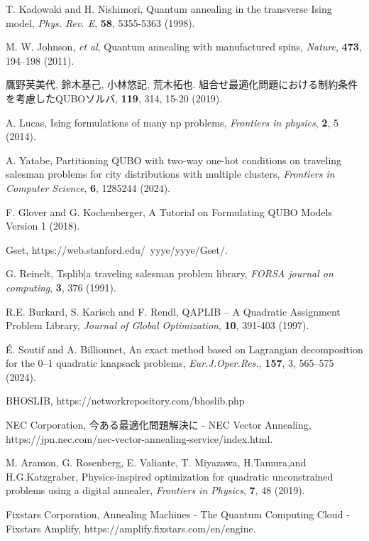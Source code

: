 \documentclass[submit,techrep,noauthor]{ipsj}
\begin{document}
\begin{thebibliography}{10}

T. Kadowaki and H. Nishimori, Quantum annealing in the transverse Ising model, {\it Phys. Rev. E}, {\bf 58}, 5355-5363 (1998).

M. W. Johnson, {\it et al}, Quantum annealing with manufactured spins, {\it Nature}, {\bf 473}, 194–198 (2011).

鷹野芙美代, 鈴木基己, 小林悠記, 荒木拓也. 組合せ最適化問題における制約条件を考慮したQUBOソルバ, {\bf 119}, 314, 15-20 (2019).

A. Lucas, Ising formulations of many np problems, {\it Frontiers in physics}, {\bf 2}, 5 (2014).

A. Yatabe, Partitioning QUBO with two-way one-hot conditions on traveling salesman problems for city distributions with multiple clusters, {\it Frontiers in Computer Science}, {\bf 6}, 1285244 (2024).

F. Glover and G. Kochenberger, A Tutorial on Formulating QUBO Models Version 1 (2018).

Gset, https://web.stanford.edu/~yyye/yyye/Gset/.

G. Reinelt, Tsplib|a traveling salesman problem library, {\it FORSA journal on computing}, {\bf 3}, 376 (1991).

R.E. Burkard, S. Karisch and F. Rendl, QAPLIB – A Quadratic Assignment Problem Library, {\it Journal of Global Optimization}, {\bf 10}, 391-403 (1997).

É. Soutif and A. Billionnet, An exact method based on Lagrangian decomposition for the 0–1 quadratic knapsack problems, {\it Eur.J.Oper.Res.}, {\bf 157}, 3, 565–575 (2024).

BHOSLIB, https://networkrepository.com/bhoslib.php

NEC Corporation, 今ある最適化問題解決に - NEC Vector Annealing, https://jpn.nec.com/nec-vector-annealing-service/index.html.

M. Aramon, G. Rosenberg, E. Valiante, T. Miyazawa, H.Tamura,and H.G.Katzgraber, Physics-inspired optimization for quadratic unconstrained problems using a digital annealer, {\it Frontiers in Physics}, {\bf 7}, 48 (2019).

Fixstars Corporation, Annealing Machines - The Quantum Computing Cloud - Fixstars Amplify, https://amplify.fixstars.com/en/engine.


\end{thebibliography}
\end{document}
